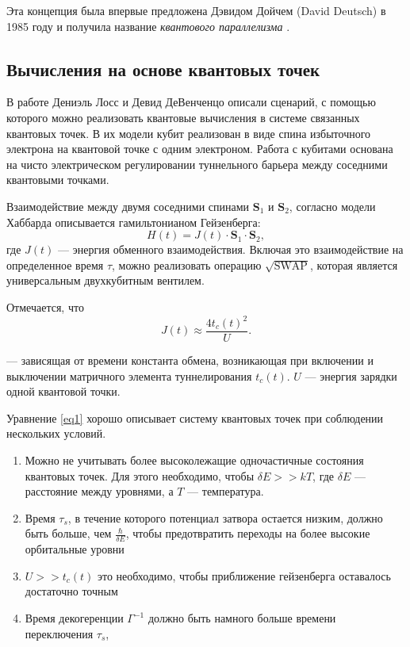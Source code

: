 \documentclass[a4paper,14pt]{extreport} %
\begin{document}
\noindent Эта концепция была впервые предложена 
Дэвидом Дойчем (David Deutsch) в 1985 году и получила название {\em квантового
параллелизма} \cite{Deutsch85a}.

\subsection{Вычисления на основе квантовых точек}

В работе \cite{ref:Loss1998} Дениэль Лосс и Девид ДеВенченцо описали сценарий, с помощью которого можно реализовать квантовые вычисления в системе связанных квантовых точек. В их модели кубит реализован в виде спина избыточного электрона на квантовой точке с одним электроном. Работа с кубитами основана на чисто электрическом регулировании туннельного барьера между соседними квантовыми точками.

Взаимодействие между двумя соседними спинами $\mathbf{S}_1$ и $\mathbf{S}_2$, согласно модели Хаббарда описывается гамильтонианом Гейзенберга:
\begin{equation}\label{eq1}
    H(t) = J(t) \cdot \mathbf{S}_1 \cdot \mathbf{S}_2,
\end{equation}
где $J(t)$ — энергия обменного взаимодействия. Включая это взаимодействие на определенное время $\tau$, можно реализовать операцию $\sqrt{\text{SWAP}}$, которая является универсальным двухкубитным вентилем.

Отмечается, что
\begin{equation}
    J(t) \approx \frac{4t_c(t)^2}{U}.
\end{equation}

— зависящая от времени константа обмена, возникающая при включении и выключении матричного элемента туннелирования $t_c(t)$. $U$ — энергия зарядки одной квантовой точки.


Уравнение \ref{eq1} хорошо описывает систему квантовых точек при соблюдении нескольких условий.
\begin{enumerate}
    \item  Можно не учитывать более высоколежащие одночастичные состояния квантовых точек. Для этого необходимо, чтобы $\delta E >> kT$, где $\delta E$ — расстояние между уровнями, а $T$ — температура.
    \item Время $\tau_s$, в течение которого потенциал затвора остается низким, должно быть больше, чем $\frac{\hbar}{\delta E}$, чтобы предотвратить переходы на более высокие орбитальные уровни
    \item $U >> t_c(t)$ это необходимо, чтобы приближение гейзенберга оставалось достаточно точным
    \item Время декогеренции $\Gamma^{-1}$ должно быть намного больше времени переключения $\tau_s$,
\end{enumerate}
\end{document}
